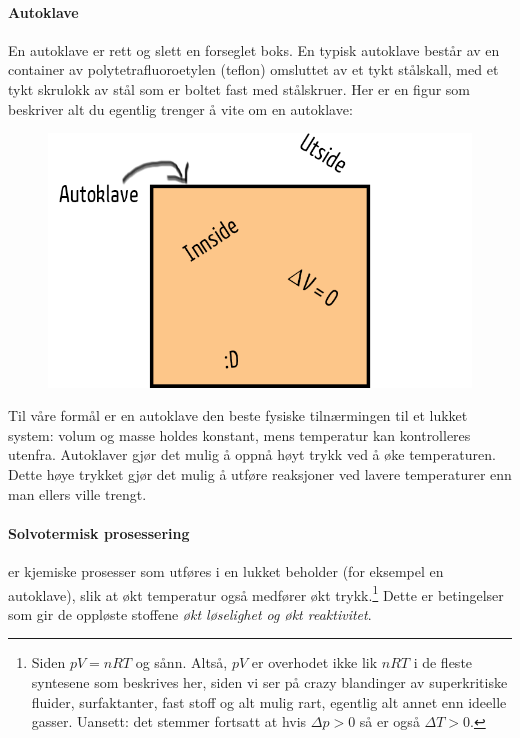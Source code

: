 \paragraph{Autoklave} En autoklave er rett og slett en forseglet boks. En typisk autoklave består av en container av polytetrafluoroetylen (teflon) omsluttet av et tykt stålskall, med et tykt skrulokk av stål som er boltet fast med stålskruer. Her er en figur som beskriver alt du egentlig trenger å vite om en autoklave:
\begin{figure}[H]
	\centering
	\includegraphics[width=0.95\linewidth]{autoklave.png}
	\label{fig:autoklave}
\end{figure}
Til våre formål er en autoklave den beste fysiske tilnærmingen til et lukket system:  volum og masse holdes konstant, mens temperatur kan kontrolleres utenfra. Autoklaver gjør det mulig å oppnå høyt trykk ved å øke temperaturen. Dette høye trykket gjør det mulig å utføre reaksjoner ved lavere temperaturer enn man ellers ville trengt.

\paragraph{Solvotermisk prosessering} er kjemiske prosesser som utføres i en lukket beholder (for eksempel en autoklave), slik at økt temperatur også medfører økt trykk.\footnote{Siden $pV=nRT$ og sånn. Altså, $pV$ er overhodet ikke lik $nRT$ i de fleste syntesene som beskrives her, siden vi ser på crazy blandinger av superkritiske fluider, surfaktanter, fast stoff og alt mulig rart, egentlig alt annet enn ideelle gasser. Uansett: det stemmer fortsatt at hvis $\Delta p > 0$ så er også $\Delta T > 0$.} Dette er betingelser som gir de oppløste stoffene \emph{økt løselighet og økt reaktivitet}.

